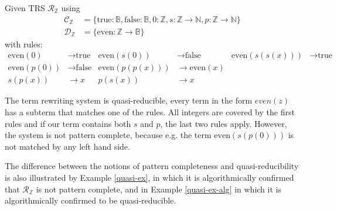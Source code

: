 \begin{example} \label{quasi-ex-complete}
Given TRS $\mathcal{R}_{\mathbb{Z}}$ using
\begin{align*}
    \mathcal{C}_{\mathbb{Z}} &= \{\text{true}: \mathbb{B}, \text{false}: \mathbb{B}, 0: \mathbb{Z}, s: \mathbb{Z} \rightarrow \mathbb{N}, p: \mathbb{Z} \rightarrow \mathbb{N}\} \\
    \mathcal{D}_{\mathbb{Z}} &= \{\text{even}: \mathbb{Z} \rightarrow \mathbb{B}\}
\end{align*}
with rules:
\begin{align*}
    \text{even}(0) &\rightarrow \text{true} & \text{even}(s(0)) &\rightarrow \text{false} & \text{even}(s(s(x))) &\rightarrow \text{true} \\
    \text{even}(p(0)) &\rightarrow \text{false} &
    \text{even}(p(p(x))) &\rightarrow \text{even}(x) \\ 
    s(p(x)) &\rightarrow x & p(s(x)) &\rightarrow x
\end{align*}
\end{example}
The term rewriting system is quasi-reducible, every term in the form $even(z)$ has a subterm that matches one of the rules. All integers are covered by the first rules and if our term contains both $s$ and $p$, the last two rules apply. However, the system is not pattern complete, because e.g. the term $\text{even}(s(p(0)))$ is not matched by any left hand side.

The difference between the notions of pattern completeness and quasi-reducibility is also illustrated by Example \ref{quasi-ex}, in which it is algorithmically confirmed that $\mathcal{R}_{\mathbb{Z}}$ is not pattern complete, and in Example \ref{quasi-ex-alg} in which it is algorithmically confirmed to be quasi-reducible.


